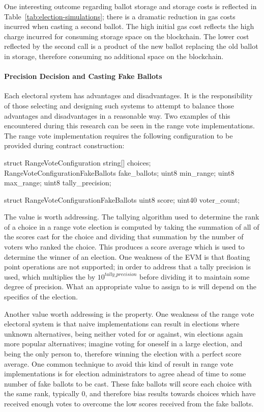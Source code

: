 One interesting outcome regarding ballot storage and storage costs is reflected
in Table~\ref{tab:election-simulations}; there is a  dramatic reduction in gas
costs incurred when casting a second ballot. The high initial gas cost reflects
the high charge incurred for consuming storage space on the blockchain. The
lower cost reflected by the second call is a product of the new ballot replacing
the old ballot in storage, therefore consuming no additional space on the
blockchain.

\paragraph{Precision Decision and Casting Fake Ballots}
Each electoral system has advantages and disadvantages. It is the responsibility
of those selecting and designing such systems to attempt to balance those
advantages and disadvantages in a reasonable way. Two examples of this
encountered during this research can be seen in the range vote implementations.
The range vote implementation requires the following configuration to be
provided during contract construction:

\begin{solidity}[RangeVoteConfiguration]
struct RangeVoteConfiguration {
  string[] choices;
  RangeVoteConfigurationFakeBallots fake_ballots;
  uint8 min_range;
  uint8 max_range;
  uint8 tally_precision;
}

struct RangeVoteConfigurationFakeBallots {
  uint8 score;
  uint40 voter_count;
}
\end{solidity}

The  value is worth addressing. The tallying algorithm used
to determine the rank of a choice in a range vote election is computed by taking
the summation of all of the scores cast for the choice and dividing that
summation by the number of voters who ranked the choice. This produces a score
average which is used to determine the winner of an election. One weakness of
the EVM is that floating point operations are not supported; in order to address
that a tally precision is used, which multiplies the  by
$10^{tally\_precision}$ before dividing it to maintain some degree of precision.
What an appropriate value to assign to  is will depend on
the specifics of the election.

Another value worth addressing is the   property.
One weakness of the range vote electoral system is that naive implementations
can result in elections where unknown alternatives, being neither voted for or
against, win elections again more popular alternatives; imagine voting for
oneself in a large election, and being the only person to, therefore winning the
election with a perfect score average. One common technique to avoid this kind
of result in range vote implementations is for election administrators to agree
ahead of time to some number of fake ballots to be cast. These fake ballots will
score each choice with the same rank, typically 0, and therefore bias results
towards choices which have received enough votes to overcome the low scores
received from the fake ballots.

